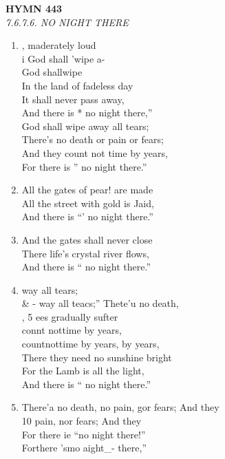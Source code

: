 \documentclass[11pt,a4paper]{article}
\begin{document}
\newpage
\begin{center}
    {\Large \textbf{HYMN 443}}
    \\
    \textit{7.6.7.6. NO NIGHT THERE}
\end{center}
\vspace{1em}

\begin{enumerate}
    \item , maderately loud \\
        i God shall 'wipe a- \\
        God shallwipe \\
        In the land of fadeless day \\
        It shall never pass away, \\
        And there is * no night there,'' \\
        God shall wipe away all tears; \\
        There's no death or pain or fears; \\
        And they count not time by years, \\
        For there is '' no night there.''

    \item All the gates of pear! are made \\
        All the street with gold is Jaid, \\
        And there is ``' no night there.''

    \item And the gates shall never close \\
        There life's crystal river flows, \\
        And there is `` no night there.''

    \item way all tears; \\
        \& - way all teacs;'' Thete'u no death, \\
        , 5 ees gradually sufter \\
        connt nottime by years, \\
        countnottime by years, by years, \\
        There they need no sunshine bright \\
        For the Lamb is all the light, \\
        And there is `` no night there.''

    \item There'a no death, no pain, gor fears; And they \\
        10 pain, nor fears; And they \\
        For there ie ``no night there!'' \\
        Forthere 'smo aight\_- there,''

\end{enumerate}
\end{document}
